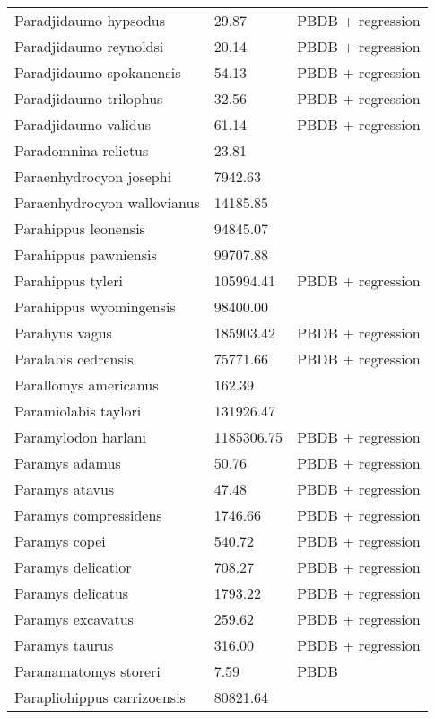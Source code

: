 \documentclass{article}
\begin{document}
\begin{center}
\begin{longtable}{p{} p{} p{}}
    Paradjidaumo hypsodus & 29.87 & PBDB + regression \\ 
    Paradjidaumo reynoldsi & 20.14 & PBDB + regression \\ 
    Paradjidaumo spokanensis & 54.13 & PBDB + regression \\ 
    Paradjidaumo trilophus & 32.56 & PBDB + regression \\ 
    Paradjidaumo validus & 61.14 & PBDB + regression \\ 
    Paradomnina relictus & 23.81 & \cite{Tomiya2013} \\ 
    Paraenhydrocyon josephi & 7942.63 & \cite{Tomiya2013} \\ 
    Paraenhydrocyon wallovianus & 14185.85 & \cite{Tomiya2013} \\ 
    Parahippus leonensis & 94845.07 & \cite{Tomiya2013} \\ 
    Parahippus pawniensis & 99707.88 & \cite{Tomiya2013} \\ 
    Parahippus tyleri & 105994.41 & PBDB + regression \\ 
    Parahippus wyomingensis & 98400.00 & \cite{MacFadden1986} \\ 
    Parahyus vagus & 185903.42 & PBDB + regression \\ 
    Paralabis cedrensis & 75771.66 & PBDB + regression \\ 
    Parallomys americanus & 162.39 & \cite{Tomiya2013} \\ 
    Paramiolabis taylori & 131926.47 & \cite{Tomiya2013} \\ 
    Paramylodon harlani & 1185306.75 & PBDB + regression \\ 
    Paramys adamus & 50.76 & PBDB + regression \\ 
    Paramys atavus & 47.48 & PBDB + regression \\ 
    Paramys compressidens & 1746.66 & PBDB + regression \\ 
    Paramys copei & 540.72 & PBDB + regression \\ 
    Paramys delicatior & 708.27 & PBDB + regression \\ 
    Paramys delicatus & 1793.22 & PBDB + regression \\ 
    Paramys excavatus & 259.62 & PBDB + regression \\ 
    Paramys taurus & 316.00 & PBDB + regression \\ 
    Paranamatomys storeri & 7.59 & PBDB \\ 
    Parapliohippus carrizoensis & 80821.64 & \cite{Tomiya2013} \\ 

\end{longtable}
\end{center}
\end{document}
